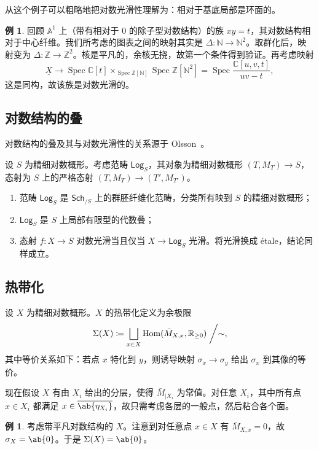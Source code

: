 \documentclass{amsart}
\theoremstyle{definition}
\newtheorem{exm}[thm]{例}
\theoremstyle{remark}
\theoremstyle{plain}
\theoremstyle{definition}
\theoremstyle{remark}
\newcommand{\A}{\mathbb{A}}
\newcommand{\N}{\mathbb{N}}
\newcommand{\R}{\mathbb{R}}
\newcommand{\C}{\mathbb{C}}
\newcommand{\Z}{\mathbb{Z}}
\newcommand{\ms}[1]{\mathsf{#1}}
\newcommand{\ol}[1]{\overline{#1}}
\newcommand{\ul}[1]{\underline{#1}}
\newcommand{\1}{\mathbf{1}}
\newcommand{\2}{\mathbf{2}}
\newcommand{\3}{\mathbf{3}}
\DeclareMathOperator{\Hom}{Hom}
\DeclareMathOperator{\Spec}{Spec}
\begin{document}
从这个例子可以粗略地把对数光滑性理解为：相对于基底局部是环面的。

\begin{exm}
    回顾 \(\A^1\) 上（带有相对于 \(0\) 的除子型对数结构）的族 \(xy = t\)，其对数结构相对于中心纤维。我们所考虑的图表之间的映射其实是 \(\Delta \colon \N \to \N^2\)。取群化后，映射变为 \(\Delta \colon \Z \to \Z^2\)。核是平凡的，余核无挠，故第一个条件得到验证。再考虑映射
    \[ \ul{X} \to \Spec \C[t] \times_{\Spec \Z[\N]} \Spec \Z[\N^2] = \Spec \frac{\C[u,v,t]}{uv-t}, \]
    这是同构，故该族是对数光滑的。
\end{exm}

\subsection{对数结构的叠}%
\label{sub:Stack of log structures}

对数结构的叠及其与对数光滑性的关系源于 Olsson~\cite{Olsson2003}。

设 \(S\) 为精细对数概形。考虑范畴 \(\ms{Log}_S\)，其对象为精细对数概形 \((T, M_T) \to S\)，态射为 \(S\) 上的严格态射 \((T, M_T) \to (T', M_{T'})\)。
\begin{enumerate}
    \item 范畴 \(\ms{Log}_S\) 是 \(\ms{Sch}_{/S}\) 上的群胚纤维化范畴，分类所有映到 \(S\) 的精细对数概形；
    \item \(\ms{Log}_S\) 是 \(S\) 上局部有限型的代数叠；
    \item 态射 \(f \colon X \to S\) 对数光滑当且仅当 \(X \to \ms{Log}_S\) 光滑。将光滑换成 \'etale，结论同样成立。
\end{enumerate}

\subsection{热带化}%
\label{sub:Tropicalization}

设 \(X\) 为精细对数概形。\(X\) 的热带化定义为余极限
\[\Sigma(X) \coloneqq \bigsqcup_{x \in X} \Hom(\bar{M}_{X,x}, \R_{\geq 0}) \biggm/ \sim, \]
其中等价关系如下：若点 \(x\) 特化到 \(y\)，则诱导映射 \(\sigma_x \to \sigma_y\) 给出 \(\sigma_x\) 到其像的等价。 

现在假设 \(X\) 有由 \(X_i\) 给出的分层，使得 \(\bar{M}_{|X_i}\) 为常值。对任意 \(X_i\)，其中所有点 \(x \in X_i\) 都满足 \(x \in \ol{\ab\{\eta_{X_i}\}}\)，故只需考虑各层的一般点，然后粘合各个面。 

\begin{exm}
    考虑带平凡对数结构的 \(X\)。注意到对任意点 \(x \in X\) 有 \(\bar{M}_{X,x} = 0\)，故 \(\sigma_X = \ab\{0\}\)。于是 \(\Sigma(X) = \ab\{0\}\)。
\end{exm}
\end{document}
